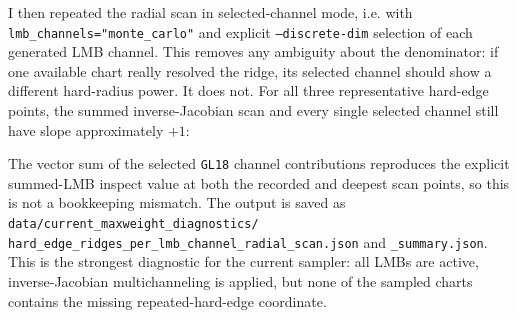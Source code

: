 \documentclass[11pt]{article}
\begin{document}
I then repeated the radial scan in selected-channel mode, i.e. with
\texttt{lmb\_channels="monte\_carlo"} and explicit \texttt{--discrete-dim}
selection of each generated LMB channel.  This removes any ambiguity about the
denominator: if one available chart really resolved the ridge, its selected
channel should show a different hard-radius power.  It does not.  For all three
representative hard-edge points, the summed inverse-Jacobian scan and every
single selected channel still have slope approximately \(+1\):
\begin{center}
\scriptsize
{}
\end{center}
The vector sum of the selected \texttt{GL18} channel contributions reproduces
the explicit summed-LMB inspect value at both the recorded and deepest scan
points, so this is not a bookkeeping mismatch.  The output is saved as
\texttt{data/current\_maxweight\_diagnostics/}
\texttt{hard\_edge\_ridges\_per\_lmb\_channel\_radial\_scan.json} and
\texttt{\_summary.json}.  This is the strongest diagnostic for the current
sampler: all LMBs are active, inverse-Jacobian multichanneling is applied, but
none of the sampled charts contains the missing repeated-hard-edge coordinate.
\end{document}
